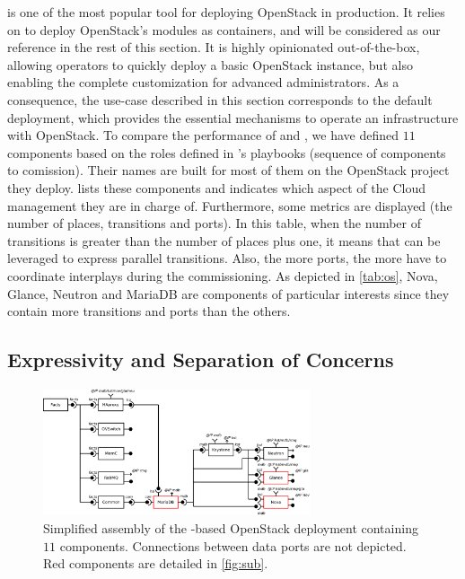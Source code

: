 \kolla is one of the most popular tool for deploying OpenStack in
production.  It relies on \ansible to deploy OpenStack's modules as
\docker containers, and will be considered as our reference in the
rest of this section. It is highly opinionated out-of-the-box,
allowing operators to quickly deploy a basic OpenStack instance, but
also enabling the complete customization for advanced
administrators. As a consequence, the use-case described in this
section corresponds to the default \kolla deployment, which provides
the essential mechanisms to operate an infrastructure with OpenStack.
%
To compare the performance of \kolla and \mad, we have defined $11$
\mad components based on the \ansible roles defined in \kolla's
playbooks (\ie \ansible sequence of components to comission). Their
names are built for most of them on the OpenStack project they deploy.
 lists these components and indicates which aspect of the
Cloud management they are in charge of. Furthermore, some \mad metrics
are displayed (\ie the number of places, transitions and ports).
%
In this table, when the number of transitions is greater than the
number of places plus one, it means that \mad can be leveraged to
express parallel transitions. Also, the more ports, the more \mad have
to coordinate interplays during the commissioning. As depicted in
\cref{tab:os}, Nova, Glance, Neutron and MariaDB are components of
particular interests since they contain more transitions and ports
than the others.

\subsection{Expressivity and Separation of Concerns}

\begin{figure}
  \begin{center}
    \includegraphics[width=0.7\textwidth]{./images/full.pdf}
    \caption{Simplified \mad assembly of the \kolla-based OpenStack deployment
    containing $11$ components. Connections between data ports are not depicted.
    Red components are detailed in \cref{fig:sub}.}
    \label{fig:full}
  \end{center}
\end{figure}

